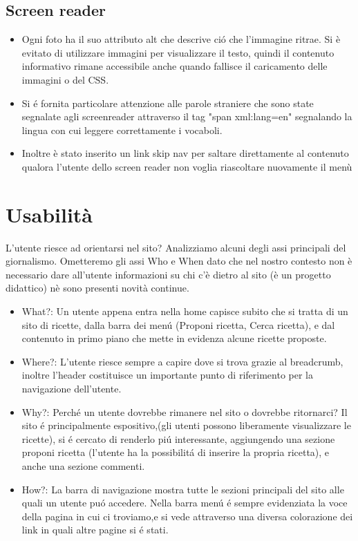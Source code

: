 \documentclass[12pt]{article}
\begin{document}
			\subsection{Screen reader}
			\begin{itemize}
				\item Ogni foto ha il suo attributo alt che descrive ci\'o che l'immagine ritrae.
				Si \`e evitato di utilizzare immagini per visualizzare il testo, quindi il contenuto informativo rimane accessibile anche quando fallisce il caricamento delle immagini o del CSS.
				\item Si \'e fornita particolare attenzione alle parole straniere che sono state segnalate agli screenreader attraverso il tag "span xml:lang=en" segnalando la lingua con cui leggere correttamente i vocaboli. 
				\item Inoltre \`e stato inserito un link skip nav per saltare direttamente al contenuto qualora l'utente dello screen reader non voglia riascoltare nuovamente il men\`u
			\end{itemize}
\newpage			\section{Usabilit\`a}
			L'utente riesce ad orientarsi nel sito? Analizziamo alcuni degli assi principali del giornalismo. Ometteremo gli assi Who e When dato che nel nostro contesto non \`e necessario dare all'utente informazioni su chi c'\`e dietro al sito (\`e un progetto didattico) n\`e sono presenti novità continue.
			\begin{itemize}
				
				\item What?: 
				Un utente appena entra nella home capisce subito che si tratta di un sito di ricette, dalla barra dei men\'u (Proponi ricetta, Cerca ricetta), e dal contenuto in primo piano che mette in evidenza alcune ricette proposte.
				
				\item Where?: 
				L'utente riesce sempre a capire dove si trova grazie al breadcrumb, inoltre l'header costituisce un importante punto di riferimento per la navigazione dell'utente.
				
				\item Why?: 
				Perch\'e un utente dovrebbe rimanere nel sito o dovrebbe ritornarci? Il sito \'e principalmente espositivo,(gli utenti possono liberamente visualizzare le ricette), si \'e cercato di renderlo pi\'u interessante, aggiungendo una sezione proponi ricetta (l'utente ha la possibilit\'a di inserire la propria ricetta), e anche una sezione commenti.
				
				\item How?:
				 La barra di navigazione mostra tutte le sezioni principali del sito alle quali un utente pu\'o accedere.
				Nella barra men\'u \'e sempre evidenziata la voce della pagina in cui ci troviamo,e si vede attraverso una diversa colorazione dei link in quali altre pagine si \'e stati. 

				
			\end{itemize}
	
	
\end{document}
